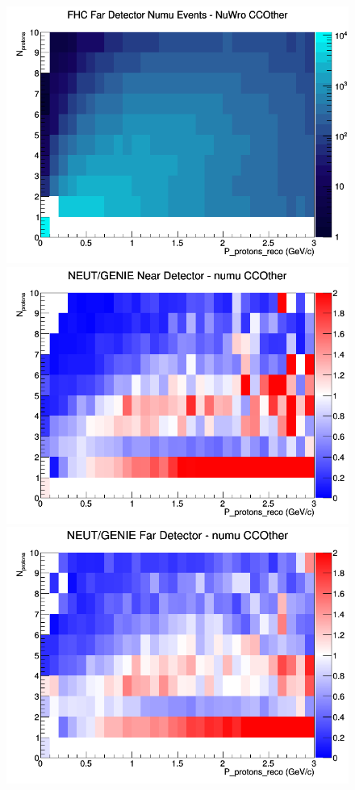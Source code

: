 \begin{figure}[h]
\endminipage
{}
\includegraphics[width=\linewidth]{eff_N_P/GAr/protons/CCOther_FHC_FD_numu_N_P_NuWro.png}
\endminipage
\newline
{}
\includegraphics[width=\linewidth]{eff_N_P/GAr/protons/ratios/CCOther_NEUT_GENIE_numu_near_N_P.png}
\endminipage
{}
\includegraphics[width=\linewidth]{eff_N_P/GAr/protons/ratios/CCOther_NEUT_GENIE_numu_far_N_P.png}

\end{figure}
